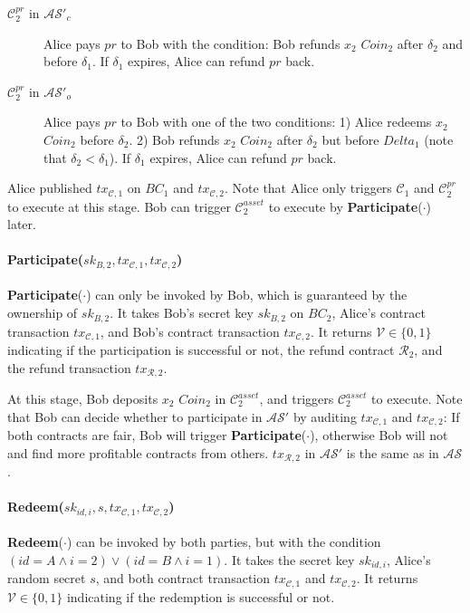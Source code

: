 \begin{description}
    \item[$\mathcal{C}^{pr}_2$ in $\mathcal{AS}'_{c}$] Alice pays $pr$ to Bob with the condition:
    Bob refunds $x_2$ $Coin_2$ after $\delta_2$ and before $\delta_1$.
    If $\delta_1$ expires, Alice can refund $pr$ back.
    \item[$\mathcal{C}^{pr}_2$ in $\mathcal{AS}'_{o}$] Alice pays $pr$ to Bob with one of the two conditions:
    1) Alice redeems $x_2$ $Coin_2$ before $\delta_2$.
    2) Bob refunds $x_2$ $Coin_2$ after $\delta_2$ but before $Delta_1$ (note that $\delta_2 < \delta_1$).
    If $\delta_1$ expires, Alice can refund $pr$ back.
\end{description}

Alice published $tx_{\mathcal{C}, 1}$ on $BC_1$ and $tx_{\mathcal{C}, 2}$.
Note that Alice only triggers $\mathcal{C}_1$ and $\mathcal{C}^{pr}_2$ to execute at this stage.
Bob can trigger $\mathcal{C}^{asset}_2$ to execute by \textbf{Participate}($\cdot$) later.


\paragraph{\textbf{Participate}($sk_{B, 2}, tx_{\mathcal{C}, 1}, tx_{\mathcal{C}, 2}$)}
\textbf{Participate}($\cdot$) can only be invoked by Bob, which is guaranteed by the ownership of $sk_{B, 2}$.
It takes Bob's secret key $sk_{B, 2}$ on $BC_2$,
Alice's contract transaction $tx_{\mathcal{C}, 1}$,
and Bob's contract transaction $tx_{\mathcal{C}, 2}$.
It returns $\mathcal{V} \in \{0, 1\}$ indicating if the participation is successful or not,
the refund contract $\mathcal{R}_2$,
and the refund transaction $tx_{\mathcal{R}, 2}$.

At this stage, Bob deposits $x_2$ $Coin_2$ in $\mathcal{C}^{asset}_2$, and triggers $\mathcal{C}^{asset}_2$ to execute.
Note that Bob can decide whether to participate in $\mathcal{AS}'$ by auditing $tx_{\mathcal{C}, 1}$ and $tx_{\mathcal{C}, 2}$: If both contracts are fair, Bob will trigger \textbf{Participate}($\cdot$), otherwise Bob will not and find more profitable contracts from others.
$tx_{\mathcal{R}, 2}$ in $\mathcal{AS}'$ is the same as in $\mathcal{AS}$.

\paragraph{\textbf{Redeem}($sk_{id, i}, s, tx_{\mathcal{C}, 1}, tx_{\mathcal{C}, 2}$)}
\textbf{Redeem}($\cdot$) can be invoked by both parties, but with the condition $(id = A \wedge i = 2) \vee (id = B \wedge i = 1)$.
It takes the secret key $sk_{id, i}$,
Alice's random secret $s$,
and both contract transaction $tx_{\mathcal{C}, 1}$ and $tx_{\mathcal{C}, 2}$.
It returns $\mathcal{V} \in \{0, 1\}$ indicating if the redemption is successful or not.


